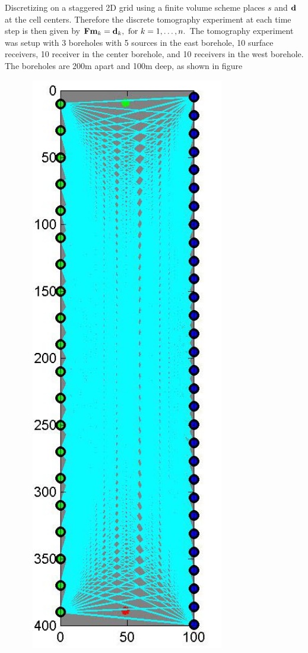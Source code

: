 \documentclass[12pt]{article}
\newcommand {\bfd}   { {\bf d} }
\newcommand {\bfm}   { {\bf m} }
\newcommand{\bF}  { {\bf F} }      %
\begin{document}
Discretizing on a staggered 2D grid using a finite volume scheme 
places $s$ and ${\bf d}$ at the cell centers. Therefore the discrete tomography experiment at each time step is then given by 
$
 	\bF{\bfm_k} = \bfd_k, \text{ for } k=1,\ldots,n.
$
The tomography experiment was setup with 3 boreholes with 5 sources in the east borehole, 10 surface receivers, 10 receiver in the center borehole, and 10 receivers in the west borehole. The boreholes are 200m apart and 100m deep, as shown in figure
\begin{figure}[h!]
\begin{center}
\	\includegraphics[width=0.75\textwidth]{figures/initialExperiment}

\end{center}
\end{figure}
\end{document}
